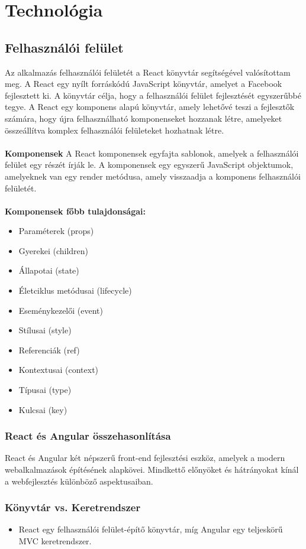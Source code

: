 \chapter{Technol\'ogia}\label{chapter:technologia}
\section{Felhasználói felület}
Az alkalmazás felhasználói felületét a React \cite[]{react} könyvtár segítségével valósítottam meg.
A React egy nyílt forráskódú JavaScript könyvtár, amelyet a Facebook fejlesztett ki.
A könyvtár célja, hogy a felhasználói felület fejlesztését egyszerűbbé tegye.
A React egy komponens alapú könyvtár, amely lehetővé teszi a fejlesztők számára,
hogy újra felhasználható komponenseket hozzanak létre, amelyeket összeállítva
komplex felhasználói felületeket hozhatnak létre.
\\
\\
\textbf{Komponensek}
A React komponensek egyfajta sablonok, amelyek a felhasználói felület egy részét írják le.
A komponensek egy egyszerű JavaScript objektumok, amelyeknek van egy render metódusa,
amely visszaadja a komponens felhasználói felületét.
\\
\\
\textbf{Komponensek főbb tulajdonságai:}
\begin{itemize}
    \item Paraméterek (props)
    \item Gyerekei (children)
    \item Állapotai (state)
    \item Életciklus metódusai (lifecycle)
    \item Eseménykezelői (event)
    \item Stílusai (style)
    \item Referenciák (ref)
    \item Kontextusai (context)
    \item Típusai (type)
    \item Kulcsai (key)
\end{itemize}
\subsection{React és Angular összehasonlítása}
React\cite[]{react} és Angular\cite[]{angular} két népszerű front-end fejlesztési eszköz, amelyek a modern webalkalmazások építésének alapkövei. Mindkettő előnyöket és hátrányokat kínál a webfejlesztés különböző aspektusaiban.
\subsection*{Könyvtár vs. Keretrendszer}
\begin{itemize}
  \item React egy felhasználói felület-építő könyvtár, míg Angular egy teljeskörű MVC keretrendszer.
\end{itemize}
